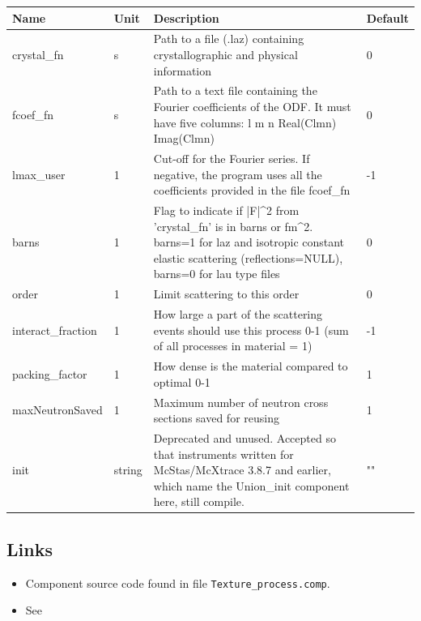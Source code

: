 \begin{longtable}{p{}p{}p{}p{}}
\toprule
\textbf{Name} & \textbf{Unit} & \textbf{Description} & \textbf{Default} \\
\midrule
\endhead
crystal\_fn & s & Path to a file (.laz) containing crystallographic and physical information & 0 \\
fcoef\_fn & s & Path to a text file containing the Fourier coefficients of the ODF. It must have five columns: l m n Real(Clmn) Imag(Clmn) & 0 \\
lmax\_user & 1 & Cut-off for the Fourier series. If negative, the program uses all the coefficients provided in the file fcoef\_fn & -1 \\
barns & 1 & Flag to indicate if |F|\textasciicircum{}2 from 'crystal\_fn' is in barns or fm\textasciicircum{}2. barns=1 for laz and isotropic constant elastic scattering (reflections=NULL), barns=0 for lau type files & 0 \\
order & 1 & Limit scattering to this order & 0 \\
interact\_fraction & 1 & How large a part of the scattering events should use this process 0-1 (sum of all processes in material = 1) & -1 \\
packing\_factor & 1 & How dense is the material compared to optimal 0-1 & 1 \\
maxNeutronSaved & 1 & Maximum number of neutron cross sections saved for reusing & 1 \\
init & string & Deprecated and unused. Accepted so that instruments written for McStas/McXtrace 3.8.7 and earlier, which name the Union\_init component here, still compile. & "" \\
\bottomrule
\end{longtable}

\subsection*{Links}
\begin{itemize}
  \item Component source code found in file \texttt{Texture\_process.comp}.
  \item See 
\end{itemize}
